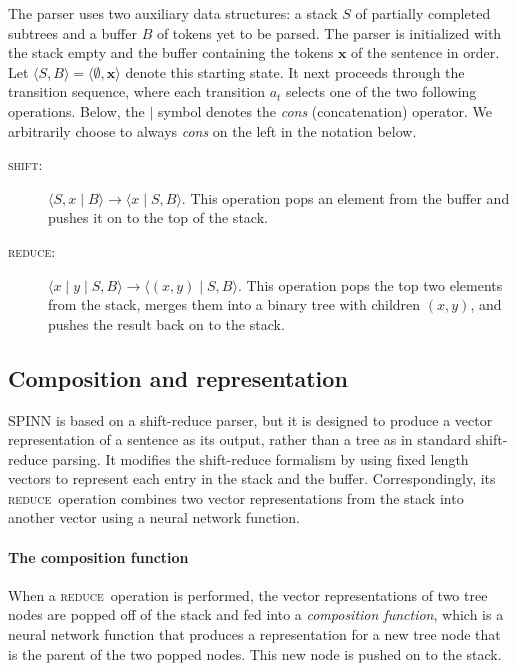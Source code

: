 \documentclass[11pt]{article}
\newcommand{\shift}{\textsc{shift}}
\newcommand{\reduce}{\textsc{reduce}}
\begin{document}
The parser uses two auxiliary data structures: a stack $S$ of partially completed subtrees and a buffer $B$ of tokens yet to be parsed. The parser is initialized with the stack empty and the buffer containing the tokens $\mathbf x$ of the sentence in order. Let $\langle S, B \rangle = \langle \emptyset, \mathbf x \rangle$ denote this starting state. It next proceeds through the transition sequence, where each transition $a_t$ selects one of the two following operations. Below, the $\mid$ symbol denotes the \textit{cons} (concatenation) operator. We arbitrarily choose to always \textit{cons} on the left in the notation below.
\vspace*{-1ex} %
\begin{description}
  \item[\shift:] $\langle S, x \mid B \rangle \to \langle x \mid S, B \rangle$. This operation pops an element from the buffer and pushes it on to the top of the stack.
\vspace*{-1ex}
  \item[\reduce:] $\langle x \mid y \mid S, B \rangle \to \langle (x, y) \mid S, B \rangle$. This operation pops the top two elements from the stack, merges them into a binary tree with children $(x, y)$, and pushes the result back on to the stack.
\end{description}

\subsection{Composition and representation}

SPINN is based on a shift-reduce parser, but it is designed to produce a vector representation of a sentence as its output, rather than a tree as in standard shift-reduce parsing. It modifies the shift-reduce formalism by using fixed length vectors to represent each entry in the stack and the buffer. Correspondingly, its \reduce\ operation combines two vector representations from the stack into another vector using a neural network function.

\paragraph{The composition function}
When a \reduce\ operation is performed, the vector representations of two tree nodes are popped off of the stack and fed into a {\it composition function}, which is a neural network function that produces a representation for a new tree node that is the parent of the two popped nodes. This new node is pushed on to the stack.
\end{document}
